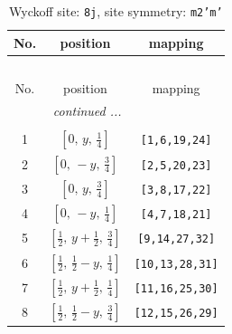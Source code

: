 \documentclass[fleqn,8pt]{jsarticle}
\begin{document}
\begin{longtable}{ccc}
\caption{Wyckoff site: {\tt 8j}, site symmetry: {\tt m2'm'}}
 \\
 \hline \hline
No. & position & mapping \\ \hline \endfirsthead

\multicolumn{2}{l}{\tablename\ \thetable{}} \\
 \hline \hline
No. & position & mapping \\ \hline \endhead

 \hline \hline
\multicolumn{2}{r}{\footnotesize\it continued ...} \\ \endfoot

 \hline \hline
\multicolumn{2}{r}{} \\ \endlastfoot

1 & $\left[ 0,\, y,\, \frac{1}{4} \right]$ & {\tt [1,6,19,24]} \\ \hline
2 & $\left[ 0,\, - y,\, \frac{3}{4} \right]$ & {\tt [2,5,20,23]} \\ \hline
3 & $\left[ 0,\, y,\, \frac{3}{4} \right]$ & {\tt [3,8,17,22]} \\ \hline
4 & $\left[ 0,\, - y,\, \frac{1}{4} \right]$ & {\tt [4,7,18,21]} \\ \hline
5 & $\left[ \frac{1}{2},\, y + \frac{1}{2},\, \frac{3}{4} \right]$ & {\tt [9,14,27,32]} \\ \hline
6 & $\left[ \frac{1}{2},\, \frac{1}{2} - y,\, \frac{1}{4} \right]$ & {\tt [10,13,28,31]} \\ \hline
7 & $\left[ \frac{1}{2},\, y + \frac{1}{2},\, \frac{1}{4} \right]$ & {\tt [11,16,25,30]} \\ \hline
8 & $\left[ \frac{1}{2},\, \frac{1}{2} - y,\, \frac{3}{4} \right]$ & {\tt [12,15,26,29]} \\
\end{longtable}
\renewcommand{\arraystretch}{1.2}
\end{document}
